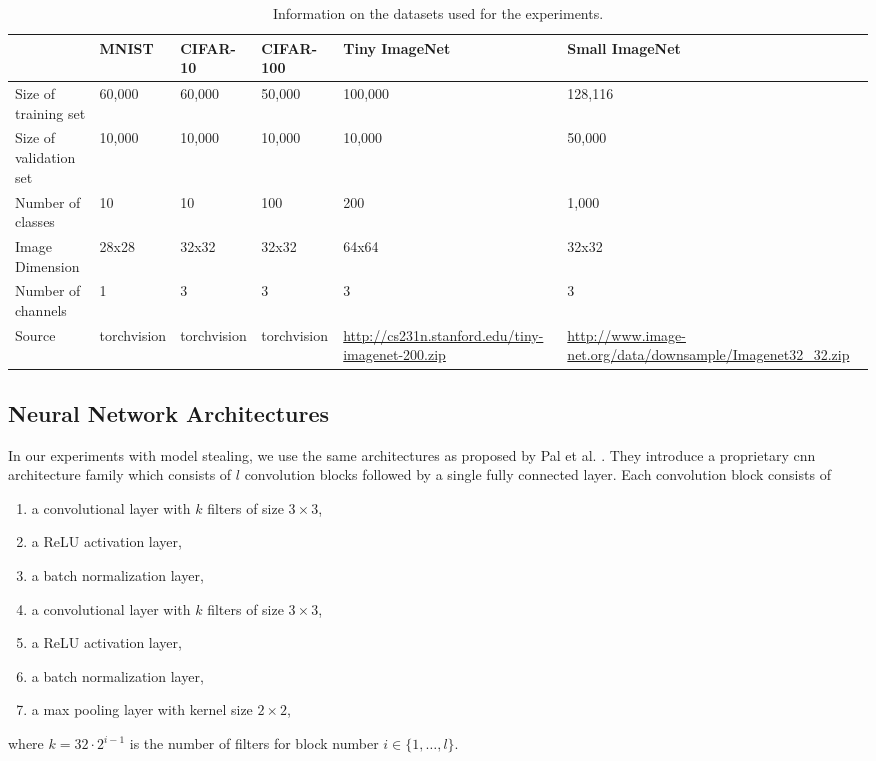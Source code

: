 \begin{table}[!htb]
    \centering
    \begin{tabularx}{\textwidth}{|X || X | X | X | X| X|}
        \hline
         & MNIST & CIFAR-10 & CIFAR-100 & Tiny \newline ImageNet & Small \newline ImageNet \\ 
        \hline 
        \hline
        Size of training set & 60,000 & 60,000& 50,000 & 100,000 & 128,116 \\ 
        \hline
        Size of validation set & 10,000 & 10,000 & 10,000 & 10,000 & 50,000\\
        \hline
        Number of classes & 10 & 10 & 100 & 200 & 1,000 \\
        \hline
        Image Dimension & 28x28 & 32x32 & 32x32 & 64x64& 32x32\\
        \hline
        Number of channels & 1 & 3 & 3 & 3 & 3 \\
        \hline
        Source & torchvision & torchvision & torchvision & {\small \url{http://cs231n.stanford.edu/tiny-imagenet-200.zip}} & {\small \url{http://www.image-net.org/data/downsample/Imagenet32_32.zip}} \\
        \hline
    \end{tabularx}
    \caption{Information on the datasets used for the experiments.}
    \label{fig:DatasetInformtion}
\end{table}



\subsection{Neural Network Architectures}
\label{sec:Appendix:Architectures}
In our experiments with model stealing, we use the same architectures as proposed by Pal et al. \cite{pal2020activethief}. They introduce a proprietary
\gls{cnn} architecture family which consists of $l$ convolution blocks followed by a single fully connected layer. Each convolution block consists
of 
\begin{enumerate}
    \item a convolutional layer with $k$ filters of size $3 \times 3$,
    \item a ReLU activation layer,
    \item a batch normalization layer,
    \item a convolutional layer with $k$ filters of size $3 \times 3$,
    \item a ReLU activation layer,
    \item a batch normalization layer,
    \item a max pooling layer with kernel size $2 \times 2$,
\end{enumerate}
where $k=32 \cdot 2^{i-1}$ is the number of filters for block number $i \in \{1,\ldots,l\}$.



